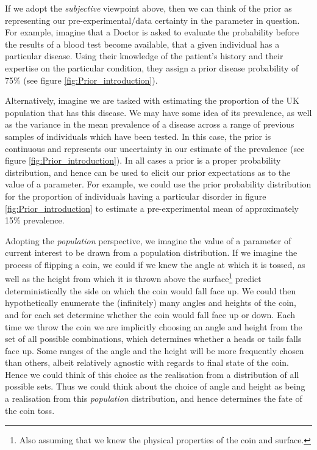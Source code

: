 \documentclass[11pt,fullpage]{book}
\begin{document}
If we adopt the \textit{subjective} viewpoint above, then we can think of the prior as representing our pre-experimental/data certainty in the parameter in question. For example, imagine that a Doctor is asked to evaluate the probability before the results of a blood test become available, that a given individual has a particular disease. Using their knowledge of the patient's history and their expertise on the particular condition, they assign a prior disease probability of 75\% (see figure \ref{fig:Prior_introduction}). 

Alternatively, imagine we are tasked with estimating the proportion of the UK population that has this disease. We may have some idea of its prevalence, as well as the variance in the mean prevalence of a disease across a range of previous samples of individuals which have been tested. In this case, the prior is continuous and represents our uncertainty in our estimate of the prevalence (see figure \ref{fig:Prior_introduction}). In all cases a prior is a proper probability distribution, and hence can be used to elicit our prior expectations as to the value of a parameter. For example, we could use the prior probability distribution for the proportion of individuals having a particular disorder in figure \ref{fig:Prior_introduction} to estimate a pre-experimental mean of approximately 15\% prevalence.

Adopting the \textit{population} perspective, we imagine the value of a parameter of current interest to be drawn from a population distribution. If we imagine the process of flipping a coin, we could if we knew the angle at which it is tossed, as well as the height from which it is thrown above the surface\footnote{Also assuming that we knew the physical properties of the coin and surface.} predict deterministically the side on which the coin would fall face up. We could then hypothetically enumerate the (infinitely) many angles and heights of the coin, and for each set determine whether the coin would fall face up or down. Each time we throw the coin we are implicitly choosing an angle and height from the set of all possible combinations, which determines whether a heads or tails falls face up. Some ranges of the angle and the height will be more frequently chosen than others, albeit relatively agnostic with regards to final state of the coin.  Hence we could think of this choice as the realisation from a distribution of all possible sets. Thus we could think about the choice of angle and height as being a realisation from this \textit{population} distribution, and hence determines the fate of the coin toss.
\end{document}

